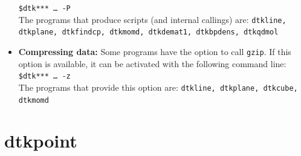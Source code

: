 \begin{itemize}
   \phantom{MMM}\texttt{\$dtk*** \dots\ -P}\\
   The programs that produce scripts (and internal callings) are: \texttt{dtkline, dtkplane, dtkfindcp, dtkmomd, dtkdemat1, dtkbpdens, dtkqdmol}
   \item \textbf{Compressing data:} Some programs have the option to call \texttt{gzip}. If this option is available, it can be activated with the following command line:\\
     \phantom{MMM}\texttt{\$dtk*** \dots\ -z}\\
     The programs that provide this option are: \texttt{dtkline, dtkplane, dtkcube, dtkmomd}
\end{itemize}

\section{dtkpoint}

